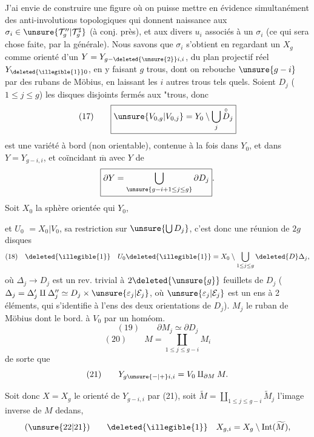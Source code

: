 J'ai envie de construire une figure  où
on puisse mettre en évidence simultanément
des anti-involutions topologiques
qui  donnent naissance aux
$\sigma_i\in\unsure{\mathcal{T}_g^{\prime\prime}|\mathcal{T}_g^\sharp}$ (à conj. près), et aux divers
$u_i$  associés à un $\sigma_i$ (ce qui sera chose
faite, par la  générale). Nous
savons que $\sigma_i$  s'obtient en regardant
un $X_g$ comme  orienté
d'un $Y=Y_{g-\deleted{\unsure{2}}i,i}$, 
du  plan projectif réel $Y_{\deleted{\illegible{1}}0}$, en
y faisant $g$ trous, dont on  rebouche
$\unsure{g-i}$ par des rubans de Möbius, en
laissant les $i$ autres trous tels quels.
Soient $D_j$ ($1\le j\le g$) les disques disjoints
fermés  aux "trous, donc
\[
(17)\qquad \boxed{\unsure{V_{0,g}|V_{0,j}}=Y_0\setminus\bigcup_j \overset{\circ}{D}_j}
\]
est une variété à bord
(non orientable), contenue à la fois dans
$Y_0$, et dans $Y=Y_{g-i,i}$, et coïncidant
$\overline{\mathrm m}$ avec $Y$  de
\[
\boxed{\partial Y=\bigcup_{\unsure{g-i+1\le j\le g}}\partial D_j}.
\]
 Soit $X_0$ la sphère orientée qui  $Y_0$,

et $U_0$  $=X_0\vert V_0$, sa restriction sur $\unsure{\bigcup D_j}$,
c'est donc  une réunion de $2g$ disques
\[
(18)\quad \deleted{\illegible{1}}\quad U_0\deleted{\illegible{1}}=X_0\setminus\bigcup_{1\le j\le g}\deleted{D}\Delta_j,
\]
où $\Delta_j\longrightarrow D_j$ est un rev. trivial à $2\deleted{\unsure{g}}$
feuillets de $D_j$ ($\Delta_j=\Delta'_j\amalg\Delta''_j\simeq D_j\times\unsure{\varepsilon_j|\mathcal{E}_j}$,
où $\unsure{\varepsilon_j|\mathcal{E}_j}$ est un ens à 2 éléments, qui s'identifie
à l'ens des deux orientations de
$D_j$). 
 $M_j$  le ruban de Möbius dont le bord.
 à $V_0$ par un homéom.
\[
(19)\qquad \partial M_j\simeq\partial D_j
\]
\[
(20)\qquad M=\coprod_{1\le j\le g-i} M_i
\]
de sorte que
\[
(21)\qquad Y_{g\unsure{-|+}i,i}=V_0\amalg_{\partial M}M.
\]


Soit donc $X=X_g$ le  orienté
de $Y_{g-i,i}$  par (21), soit $\widetilde M=\coprod_{1\le j\le g-i}\widetilde M_j$
l'image inverse de $M$ dedans, 
 
\[
(\unsure{22|21})\qquad \deleted{\illegible{1}}\quad X_{g,i}=X_g\setminus\operatorname{Int}(\widetilde M),
\]
